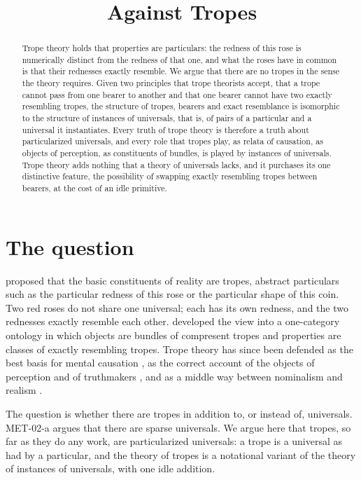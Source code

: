 \documentclass{situationist-preprint}
\title{Against Tropes}
\begin{document}
\maketitle

\begin{abstract}
Trope theory holds that properties are particulars: the redness of this rose is numerically distinct from the redness of that one, and what the roses have in common is that their rednesses exactly resemble. We argue that there are no tropes in the sense the theory requires. Given two principles that trope theorists accept, that a trope cannot pass from one bearer to another and that one bearer cannot have two exactly resembling tropes, the structure of tropes, bearers and exact resemblance is isomorphic to the structure of instances of universals, that is, of pairs of a particular and a universal it instantiates. Every truth of trope theory is therefore a truth about particularized universals, and every role that tropes play, as relata of causation, as objects of perception, as constituents of bundles, is played by instances of universals. Trope theory adds nothing that a theory of universals lacks, and it purchases its one distinctive feature, the possibility of swapping exactly resembling tropes between bearers, at the cost of an idle primitive.
\end{abstract}

\section{The question}

\citet{Williams1953} proposed that the basic constituents of reality are tropes, abstract particulars such as the particular redness of this rose or the particular shape of this coin. Two red roses do not share one universal; each has its own redness, and the two rednesses exactly resemble each other. \citet{Campbell1990} developed the view into a one-category ontology in which objects are bundles of compresent tropes and properties are classes of exactly resembling tropes. Trope theory has since been defended as the best basis for mental causation \citep{Ehring2011}, as the correct account of the objects of perception and of truthmakers \citep{MulliganSimonsSmith1984}, and as a middle way between nominalism and realism \citep{Maurin2002}.

The question is whether there are tropes in addition to, or instead of, universals. MET-02-a argues that there are sparse universals. We argue here that tropes, so far as they do any work, are particularized universals: a trope is a universal as had by a particular, and the theory of tropes is a notational variant of the theory of instances of universals, with one idle addition.
\end{document}
